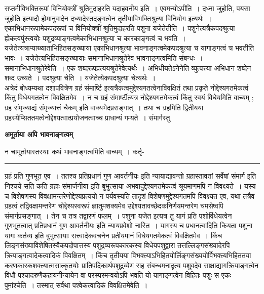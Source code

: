 \documentclass[11pt, openany]{book}
\makeatletter
\def\blfootnote{\gdef\@thefnmark{}\@footnotetext}
\makeatother
\begin{document}
 सप्तमीविभक्तिरूपां विनियोक्त्रीं श्रुतिमुदाहरति {\br यदाहवनीय इति~। एवमन्योऽपीति~।} {\qt दध्ना जुहोति, पयसा जुहोति} इत्यादौ होमानुवादेन दध्यादेस्तदङ्गत्वेन तृतीयाविभक्तिश्रुत्या विनियोग इत्यर्थः~।~\\

 एकाभिधानरूपामेकपदरूपां च विनियोक्त्रीं श्रुतिमुदाहरति  {\br पशुना यजेतेतीति~।} पशुनेत्यत्रैकपदश्रुत्या ह्येकत्वपुंस्त्वयोः पशुद्रव्याङ्गत्वमेकाभिधानश्रुत्या च कारकाङ्गत्वं च भवति~। यजेतेत्यत्राप्याख्याताभिहितसङ्ख्याया एकाभिधानश्रुत्या भावनाङ्गत्वमेकपदश्रुत्या च यागाङ्गत्वं च भवतीति भावः~। यजेतेत्यभिहितसङ्ख्यायाः समानाभिधानश्रुतेरेव भावनाङ्गत्वमिति संबन्धः~। {\br समानाभिधानश्रुतेरेवेति~।} {\qt एक} शब्दरूपप्रत्ययश्रुतेरेवेत्यर्थः~। अभिधीयतेऽनेनेति व्युत्पत्त्या {\qt अभिधान} शब्देन शब्द उच्यते~। {\br पदश्रुत्या चेति~।} यजेतेत्येकपदश्रुत्या चेत्यर्थः~।\\

 {\br अत्रेदं बोध्यम्}\textendash यथा {\qt दशापवित्रेण ग्रहं संमार्ष्टि} इत्यत्रैकत्वमुद्देश्यगतत्वेनाविवक्षितं तथा प्रकृते नोद्देश्यगतमेकत्वं किंतु विधेयगतत्वेन विवक्षितमेव~। न च ग्रहं संमार्ष्टीत्यत्र नोद्देश्यगतमेकत्वं किंतु स्वयं विधेयमिति वाच्यम् ; {\qt ग्रह संमृज्याद्यं संमृज्यात्तं चैकम्} इति वाक्यभेदप्रसङ्गात्~। तथा च ग्रहमिति द्वितीयया
ग्रहस्येप्सिततमत्वेनोद्देश्यत्वात्प्रयोजनत्वाच्च प्राधान्यं गम्यते~। संमार्गस्तु
\blfootnote{पाठा०\textemdash\ $^{१}$अर्थभावनाङ्गत्वम्}
\newpage
\fancyhead[RE]{[ अमूर्ताया अपि}
\begin{center}
 \textbf{अमूर्ताया अपि भावनाङ्गत्वम् }    
\end{center}

{\bl न चामूर्तायास्तस्याः कथं भावनाङ्गत्वमिति वाच्यम्~। कर्तृ- }\\
\hrule
\vspace{3mm}
\noindent
ग्रहं प्रति गुणभूत एव~। ततश्च {\qt प्रतिप्रधानं गुण आवर्तनीयः} इति न्यायाद्यावन्तो ग्रहास्तावतां  सर्वेषां संमार्ग इति निश्चये सति कति ग्रहाः संमार्जनीया इति बुभुत्साया अभवादुद्देश्यगतमेकत्वं श्रूयमाणमपि न विवक्ष्यते~। यस्य च विशेषणस्य विवक्षामन्तरेणोद्देश्यप्रत्ययो न पर्यवस्यति तादृशं विशेषणमुद्देश्यगतमपि विवक्ष्यत एव, यथा तत्रैव ग्रहत्वं
तद्विवक्षामन्तरेण चोद्देश्यस्वरूपं ज्ञातुमशक्यमेव उद्देश्यतावच्छेदकनिर्णयमन्तरेण चमसेष्वपि संमार्गप्रसङ्गात्~। तेन च तत्र तद्वारणं फलम्~। {\qt पशुना यजेत} इत्यत्र तु यागं प्रति पशोर्विधेयत्वेन गुणभूतत्वात् {\qt प्रतिप्रधानं गुण आवर्तनीयः} इति न्यायप्रवेशो नास्ति~। यागस्य च प्रधानत्वादिति कियता पशुना यागः कर्तव्य इति बुभुत्सायाः
सत्त्वादेकवचनेन प्रतीयमानं विधेयगतमेकत्वं विवक्षितमेव~। किंच लिङ्गसंख्याविशेषितस्यैकपदोपात्तस्य पशुद्रव्यरूपकारकस्य विधेयपशुद्वारा तत्तल्लिङ्गसंख्यादेरपि क्रियाङ्गत्वादेकत्वादिकं विवक्षितम्~। किंच तृतीयया विभक्त्याऽभिहितयोर्लिङ्गसंख्ययोर्विभक्त्यभिहिततया करणकारकशक्त्यात्मसात्कृतयोः प्रातिपदिकार्थपशुद्रव्येण सह संबन्धमनादृत्य पशुवदेव साक्षाद्यागक्रियाङ्गत्वेन विधौ पश्चादरुणैकहायनीन्यायेन वा परस्परमन्वयोऽपि भवति {\qt यो यागाङ्गत्वेन विहितः पशुः स एकः पुमांश्चेति~}।
तस्मात् सर्वथा पश्वेकत्वादिकं विवक्षितमेवेति~।\\
\end{document}
